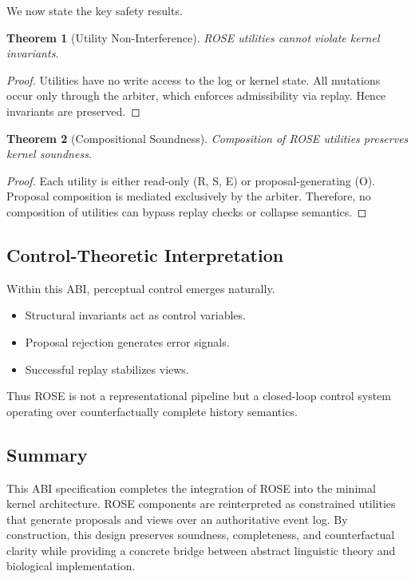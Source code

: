 \documentclass[11pt]{article}
\newtheorem{theorem}{Theorem}
\begin{document}
We now state the key safety results.

\begin{theorem}[Utility Non-Interference]
ROSE utilities cannot violate kernel invariants.
\end{theorem}

\begin{proof}
Utilities have no write access to the log or kernel state. All mutations occur only through the arbiter, which enforces admissibility via replay. Hence invariants are preserved.
\end{proof}

\begin{theorem}[Compositional Soundness]
Composition of ROSE utilities preserves kernel soundness.
\end{theorem}

\begin{proof}
Each utility is either read-only (R, S, E) or proposal-generating (O). Proposal composition is mediated exclusively by the arbiter. Therefore, no composition of utilities can bypass replay checks or collapse semantics.
\end{proof}

\subsection{Control-Theoretic Interpretation}

Within this ABI, perceptual control emerges naturally.

\begin{itemize}
  \item Structural invariants act as control variables.
  \item Proposal rejection generates error signals.
  \item Successful replay stabilizes views.
\end{itemize}

Thus ROSE is not a representational pipeline but a closed-loop control system operating over counterfactually complete history semantics.

\subsection{Summary}

This ABI specification completes the integration of ROSE into the minimal kernel architecture. ROSE components are reinterpreted as constrained utilities that generate proposals and views over an authoritative event log. By construction, this design preserves soundness, completeness, and counterfactual clarity while providing a concrete bridge between abstract linguistic theory and biological implementation.
\end{document}
